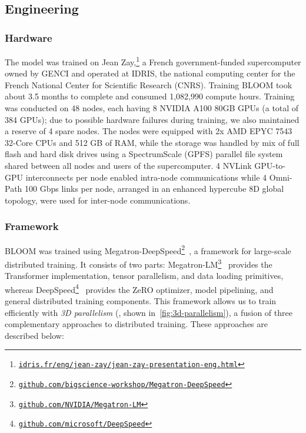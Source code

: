 \subsection{Engineering}
\label{sec:engineering}

\subsubsection{Hardware}

The model was trained on Jean Zay,\footnote{\href{http://www.idris.fr/eng/jean-zay/jean-zay-presentation-eng.html}{\texttt{idris.fr/eng/jean-zay/jean-zay-presentation-eng.html}}} a French government-funded supercomputer owned by GENCI and operated at IDRIS, the national computing center for the French National Center for Scientific Research (CNRS). Training BLOOM took about 3.5 months to complete and consumed 1,082,990 compute hours. Training was conducted on 48 nodes, each having 8 NVIDIA A100 80GB GPUs (a total of 384 GPUs); due to possible hardware failures during training, we also maintained a reserve of 4 spare nodes. The nodes were equipped with 2x AMD EPYC 7543 32-Core CPUs and 512 GB of RAM, while the storage was handled by mix of full flash and hard disk drives using a SpectrumScale (GPFS) parallel file system shared between all nodes and users of the supercomputer. 4 NVLink GPU-to-GPU interconnects per node enabled intra-node communications while 4 Omni-Path 100 Gbps links per node, arranged in an enhanced hypercube 8D global topology, were used for inter-node communications.

\subsubsection{Framework}
BLOOM was trained using Megatron-DeepSpeed\footnote{\href{https://github.com/bigscience-workshop/Megatron-DeepSpeed}{\texttt{github.com/bigscience-workshop/Megatron-DeepSpeed}}}~\citep{smith2022using}, a framework for large-scale distributed training. It consists of two parts: Megatron-LM\footnote{\href{https://github.com/NVIDIA/Megatron-LM}{\texttt{github.com/NVIDIA/Megatron-LM}}}~\citep{shoeybi2019megatron} provides the Transformer implementation, tensor parallelism, and data loading primitives, whereas DeepSpeed\footnote{\href{https://github.com/microsoft/DeepSpeed}{\texttt{github.com/microsoft/DeepSpeed}}}~\citep{rasley2020deepspeed} provides the ZeRO optimizer, model pipelining, and general distributed training components. This framework allows us to train efficiently with \textit{3D parallelism} (\citealp{narayanan2021efficient}, shown in~\autoref{fig:3d-parallelism}), a fusion of three complementary approaches to distributed training. These approaches are described below:

